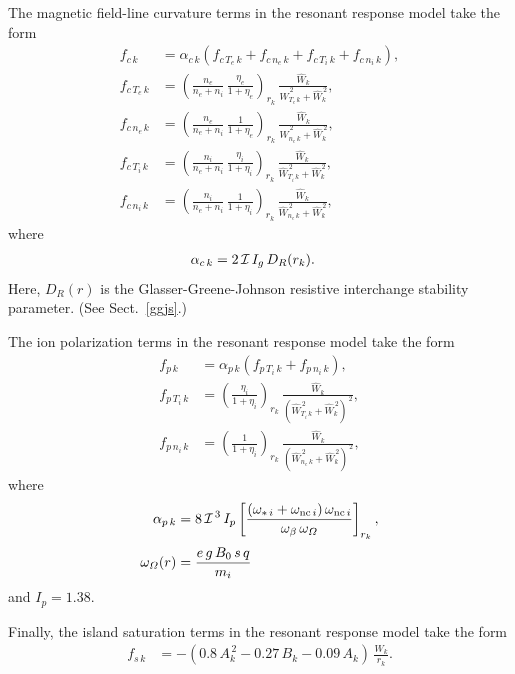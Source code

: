 \documentclass[12pt,prb,aps]{revtex4-1}
\begin{document}
The magnetic field-line curvature terms in the resonant response model take the form\,\cite{rfx,rfy}
\begin{align}
f_{c\,k} &= \alpha_{c\,k}\left(f_{c\,T_e\,k} + f_{c\,n_e\,k} + f_{c\,T_i\,k} + f_{c\,n_i\,k}\right),\\[0.5ex]
f_{c\,T_e\,k}&=\left(\frac{n_e}{n_e+n_i}\,\frac{\eta_e}{1+\eta_e}\right)_{r_k}\,\frac{\hat{W}_k}{\hat{W}_{T_e\,k}^{\,2}+\hat{W}_k^{\,2}},\\[0.5ex]
f_{c\,n_e\,k}&=\left(\frac{n_e}{n_e+n_i}\,\frac{1}{1+\eta_e}\right)_{r_k}\,\frac{\hat{W}_k}{\hat{W}_{n_e\,k}^{\,2}+\hat{W}_k^{\,2}},\\[0.5ex]
f_{c\,T_i\,k}&=\left(\frac{n_i}{n_e+n_i}\,\frac{\eta_i}{1+\eta_i}\right)_{r_k}\,\frac{\hat{W}_k}{\hat{W}_{T_i\,k}^{\,2}+\hat{W}_k^{\,2}},\\[0.5ex]
f_{c\,n_i\,k}&=\left(\frac{n_i}{n_e+n_i}\,\frac{1}{1+\eta_i}\right)_{r_k}\,\frac{\hat{W}_k}{\hat{W}_{n_e\,k}^{\,2}+\hat{W}_k^{\,2}},
\end{align}
where
\begin{align}
\alpha_{c\,k} &= 2\,{\cal I}\,I_g\,D_R(r_k).
\end{align}
Here, $D_R(r)$ is the Glasser-Greene-Johnson resistive interchange stability parameter. (See Sect.~\ref{ggjs}.)

The ion polarization terms in the resonant response model  take the form\,\cite{rfx,rfy}
\begin{align}
f_{p\,k} &= \alpha_{p\,k}\left(f_{p\,T_i\,k} + f_{p\,n_i\,k}\right),\\[0.5ex]
f_{p\,T_i\,k}&=\left(\frac{\eta_i}{1+\eta_i}\right)_{r_k}\,\frac{\hat{W}_k}{(\hat{W}_{T_i\,k}^{\,2}+\hat{W}_k^{\,2})^{\,2}},\\[0.5ex]
f_{p\,n_i\,k}&=\left(\frac{1}{1+\eta_i}\right)_{r_k}\,\frac{\hat{W}_k}{(\hat{W}_{n_e\,k}^{\,2}+\hat{W}_k^{\,2})^{\,2}},
\end{align}
where
\begin{align}
\alpha_{p\,k} &= 8\,{\cal I}^{\,3}\, I_p\left[\frac{(\omega_{\ast\,i}+\omega_{{\rm nc}\,i})\,\omega_{{\rm nc}\,i}}{\omega_\beta\,\omega_{\mit\Omega}}\right]_{r_k},\\[0.5ex]
\omega_{\mit\Omega}(r)&= \frac{e\,g\,B_0\,s\,q}{m_i}
\end{align}
and  $I_p=1.38$. 


Finally, the island saturation terms in the resonant response model  take the form\,\cite{porc}
\begin{align}
f_{s\,k} &=-(0.8\,A_k^{\,2} - 0.27\,B_k-0.09\,A_k)\,
\frac{W_k}{r_k}.
\end{align}
\end{document}
